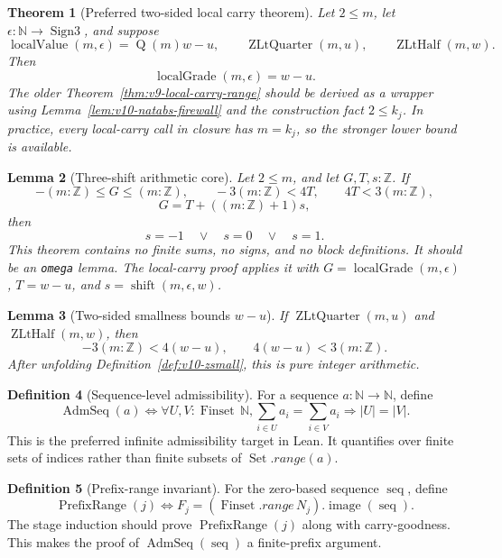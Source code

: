 \documentclass[11pt]{article}
\theoremstyle{definition}
\newtheorem{definition}{Definition}[section]
\theoremstyle{plain}
\newtheorem{theorem}[definition]{Theorem}
\newtheorem{lemma}[definition]{Lemma}
\theoremstyle{remark}
\newcommand{\N}{\mathbb{N}}
\newcommand{\Z}{\mathbb{Z}}
\newcommand{\Finset}{\operatorname{Finset}}
\newcommand{\Set}{\operatorname{Set}}
\newcommand{\Sgn}{\operatorname{Sign3}}
\newcommand{\card}[1]{\left|#1\right|}
\newcommand{\Qfun}{\operatorname{Q}}
\newcommand{\LGrade}{\operatorname{localGrade}}
\newcommand{\LVal}{\operatorname{localValue}}
\newcommand{\seq}{\operatorname{seq}}
\newcommand{\ZLtQuarter}{\operatorname{ZLtQuarter}}
\newcommand{\ZLtHalf}{\operatorname{ZLtHalf}}
\newcommand{\Shift}{\operatorname{shift}}
\newcommand{\AdmSeq}{\operatorname{AdmSeq}}
\newcommand{\PrefixRange}{\operatorname{PrefixRange}}
\begin{document}
\begin{theorem}[Preferred two-sided local carry theorem]\label{thm:v10-local-carry-zsmall}
Let \(2\le m\), let \(\epsilon:\N\to\Sgn\), and suppose
\[
        \LVal(m,\epsilon)=\Qfun(m)w-u,
        \qquad
        \ZLtQuarter(m,u),
        \qquad
        \ZLtHalf(m,w).
\]
Then
\[
        \LGrade(m,\epsilon)=w-u.
\]
The older Theorem~\ref{thm:v9-local-carry-range} should be derived as a wrapper using Lemma~\ref{lem:v10-natabs-firewall} and the construction fact \(2\le k_j\).  In practice, every local-carry call in closure has \(m=k_j\), so the stronger lower bound is available.
\end{theorem}

\begin{lemma}[Three-shift arithmetic core]\label{lem:v10-three-shift-core}
Let \(2\le m\), and let \(G,T,s:\Z\).  If
\[
        -(m:\Z)\le G\le (m:\Z),
        \qquad
        -3(m:\Z)<4T,
        \qquad
        4T<3(m:\Z),
\]
\[
        G=T+((m:\Z)+1)s,
\]
then
\[
        s=-1\quad\vee\quad s=0\quad\vee\quad s=1.
\]
This theorem contains no finite sums, no signs, and no block definitions.  It should be an \verb|omega| lemma.  The local-carry proof applies it with \(G=\LGrade(m,\epsilon)\), \(T=w-u\), and \(s=\Shift(m,\epsilon,w)\).
\end{lemma}

\begin{lemma}[Two-sided smallness bounds \(w-u\)]\label{lem:v10-t-bound}
If \(\ZLtQuarter(m,u)\) and \(\ZLtHalf(m,w)\), then
\[
        -3(m:\Z)<4(w-u),
        \qquad
        4(w-u)<3(m:\Z).
\]
After unfolding Definition~\ref{def:v10-zsmall}, this is pure integer arithmetic.
\end{lemma}

\begin{definition}[Sequence-level admissibility]\label{def:v10-admseq}
For a sequence \(a:\N\to\N\), define
\[
        \AdmSeq(a)\Longleftrightarrow
        \forall U,V:\Finset\,\N,
        \sum_{i\in U}a_i=\sum_{i\in V}a_i\Longrightarrow \card U=\card V.
\]
This is the preferred infinite admissibility target in Lean.  It quantifies over finite sets of indices rather than finite subsets of \(\Set.range(a)\).
\end{definition}

\begin{definition}[Prefix-range invariant]\label{def:v10-prefix-range}
For the zero-based sequence \(\seq\), define
\[
        \PrefixRange(j)\Longleftrightarrow
        F_j=(\Finset.range\,N_j).\operatorname{image}(\seq).
\]
The stage induction should prove \(\PrefixRange(j)\) along with carry-goodness.  This makes the proof of \(\AdmSeq(\seq)\) a finite-prefix argument.
\end{definition}
\end{document}

